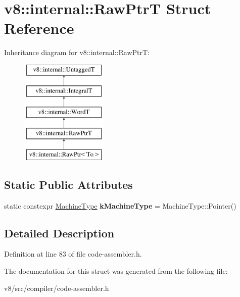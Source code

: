 \hypertarget{structv8_1_1internal_1_1RawPtrT}{}\section{v8\+:\+:internal\+:\+:Raw\+PtrT Struct Reference}
\label{structv8_1_1internal_1_1RawPtrT}
Inheritance diagram for v8\+:\+:internal\+:\+:Raw\+PtrT\+:\begin{figure}[H]
\begin{center}
\leavevmode
\includegraphics[height=5.000000cm]{structv8_1_1internal_1_1RawPtrT}
\end{center}
\end{figure}
\subsection*{Static Public Attributes}
\begin{DoxyCompactItemize}
\item 
\mbox{\label{structv8_1_1internal_1_1RawPtrT_a86568191c28fc523ef7e66165c404d2d}} 
static constexpr \mbox{\hyperlink{classv8_1_1internal_1_1MachineType}{Machine\+Type}} {\bfseries k\+Machine\+Type} = Machine\+Type\+::\+Pointer()
\end{DoxyCompactItemize}


\subsection{Detailed Description}


Definition at line 83 of file code-\/assembler.\+h.



The documentation for this struct was generated from the following file\+:\begin{DoxyCompactItemize}
\item 
v8/src/compiler/code-\/assembler.\+h\end{DoxyCompactItemize}
